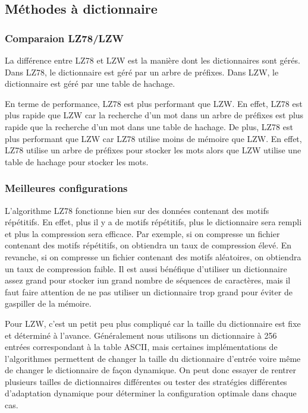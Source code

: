 \subsection{Méthodes à dictionnaire}

    \subsubsection{Comparaion LZ78/LZW}

    La différence entre LZ78 et LZW est la manière dont les dictionnaires sont gérés. Dans LZ78, le dictionnaire est géré par un arbre de préfixes. Dans LZW, le dictionnaire est géré par une table de hachage.

    \medskip

    En terme de performance, LZ78 est plus performant que LZW. En effet, LZ78 est plus rapide que LZW car la recherche d'un mot dans un arbre de préfixes est plus rapide que la recherche d'un mot dans une table de hachage. De plus, LZ78 est plus performant que LZW car LZ78 utilise moins de mémoire que LZW. En effet, LZ78 utilise un arbre de préfixes pour stocker les mots alors que LZW utilise une table de hachage pour stocker les mots.

    \subsubsection{Meilleures configurations}

    L'algorithme LZ78 fonctionne bien sur des données contenant des motifs répétitifs. En effet, plus il y a de motifs répétitifs, plus le dictionnaire sera rempli et plus la compression sera efficace. Par exemple, si on compresse un fichier contenant des motifs répétitifs, on obtiendra un taux de compression élevé. En revanche, si on compresse un fichier contenant des motifs aléatoires, on obtiendra un taux de compression faible. Il est aussi bénéfique d'utiliser un dictionnaire assez grand pour stocker iun grand nombre de séquences de caractères, mais il faut faire attention de ne pas utiliser un dictionnaire trop grand pour éviter de gaspiller de la mémoire.

    Pour LZW, c'est un petit peu plus compliqué car la taille du dictionnaire est fixe et déterminé à l'avance. Généralement nous utilisons un dictionnaire à 256 entrées correspondant à la table ASCII, mais certaines implémentations de l'algorithmes permettent de changer la taille du dictionnaire d'entrée voire même de changer le dictionnaire de façon dynamique. On peut donc essayer de rentrer plusieurs tailles de dictionnaires différentes ou tester des stratégies différentes d'adaptation dynamique pour déterminer la configuration optimale dans chaque cas.